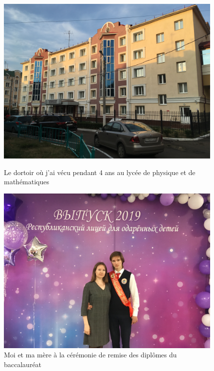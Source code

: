 \documentclass[a4paper,12pt]{article}
\begin{document}
\begin{figure}[htbp]
	\centering
	\begin{minipage}{0.3\textwidth}
		\centering
		\includegraphics[width=\linewidth]{11}
		\caption{Le dortoir où j'ai vécu pendant 4 ans au lycée de physique et de mathématiques}
		\label{fig:image1}
	\end{minipage}
	\hfill
	\begin{minipage}{0.3\textwidth}
		\centering
		\includegraphics[width=\linewidth]{12}
		\caption{Moi et ma mère à la cérémonie de remise des diplômes du baccalauréat}
		\label{fig:image2}
	\end{minipage}
	\hfill
	\begin{minipage}{0.3\textwidth}

\end{minipage}
\end{figure}
\end{document}
